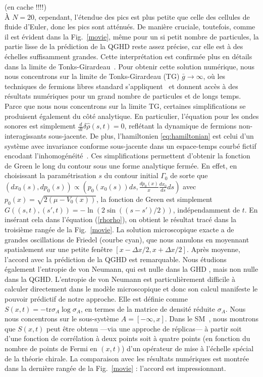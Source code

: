 \documentclass[twocolumn,amsfonts,showpacs,superscriptaddress]{revtex4-1}
\begin{document}
{(en cache !!!!) \\
À $N=20$, cependant, l'étendue des pics est plus petite que celle des cellules de fluide d'Euler, donc les pics sont atténués. De manière cruciale, toutefois, comme il est évident dans la Fig.~\ref{movie}, même pour un si petit nombre de particules, la partie lisse de la prédiction de la QGHD reste assez précise, car elle est à des échelles suffisamment grandes. Cette interprétation est confirmée plus en détails dans la limite de Tonks-Girardeau~\cite{inpreparation}. 
Pour obtenir cette solution numérique, nous nous concentrons sur la limite de Tonks-Girardeau (TG) $\bar{g} \rightarrow \infty$, où les techniques de fermions libres standard s'appliquent~\cite{girardeau1960relationship} et donnent accès à des résultats numériques pour un grand nombre de particules et de longs temps. Parce que nous nous concentrons sur la limite TG, certaines simplifications se produisent également du côté analytique. En particulier, l'équation pour les ondes sonores est simplement $\frac{d}{dt} \delta \hat{\rho}(s ,t ) = 0$, reflétant la dynamique de fermions non-interagissants sous-jacente. De plus, l'hamiltonien \eqref{eq:hamiltonian} est celui d'un système avec invariance conforme sous-jacente dans un espace-temps courbé fictif encodant l'inhomogénéité~\cite{dubail2017conformal,brun2017one,ruggiero2019conformal}. Ces simplifications permettent d'obtenir la fonction de Green le long du contour sous une forme analytique fermée. En effet, en choisissant la paramétrisation $s$ du contour initial $\Gamma_0$ de sorte que $(d x_0(s), d p_0(s)) \propto ( p_0(x_0(s)) ds, \frac{d p_0(x)}{x} \frac{dx_0}{ds} ds )$ avec $p_0(x) = \sqrt{2 (\mu - V_0 (x))}$, la fonction de Green est simplement~\cite{dubail2017conformal,ruggiero2019conformal} $G ((s,t) ,(s',t)) = - \ln \left( 2 \sin ( (s-s')/2)\right)$, indépendamment de $t$. En insérant cela dans l'équation (\ref{rhorho}), on obtient le résultat tracé dans la troisième rangée de la Fig.~\ref{movie}. La solution microscopique exacte a de grandes oscillations de Friedel (courbe cyan), que nous annulons en moyennant spatialement sur une petite fenêtre $[x-\Delta x/2,x+\Delta x/2]$. Après moyenne, l'accord avec la prédiction de la QGHD est remarquable.
Nous étudions également l'entropie de von Neumann, qui est nulle dans la GHD \cite{entGHDfree,entGHDint}, mais non nulle dans la QGHD. L'entropie de von Neumann est particulièrement difficile à calculer directement dans le modèle microscopique et donc son calcul manifeste le pouvoir prédictif de notre approche. Elle est définie comme $S(x,t) = - \textrm{tr} \sigma_A \log \sigma_A$, en termes de la matrice de densité réduite $\sigma_A$. Nous nous concentrons sur le sous-système $A= [-\infty, x]$. Dans le SM~\cite{SM}, nous montrons que $S(x, t)$ peut être obtenu ---via une approche de réplicas--- à partir soit d'une fonction de corrélation à deux points soit à quatre points 
(en fonction du nombre de points de Fermi en $(x, t)$) d'un opérateur de mise à l'échelle spécial de la théorie chirale.
La comparaison avec les résultats numériques est montrée dans la dernière rangée de la Fig.~\ref{movie} : l'accord est impressionnant.
}
\end{document}
